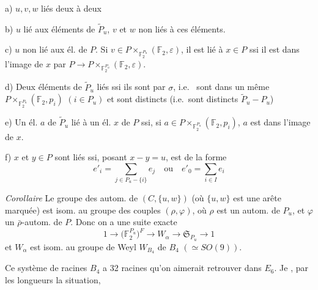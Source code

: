 \documentclass[11pt,a4paper]{article}
\begin{document}
a) $u, v, w$ liés deux à deux

b) $u$ lié aux éléments de $\widetilde{P}_u$, $v$ et $w$ non liés à ces
éléments.

c) $u$ non lié aux él. de \struck{\ill{}} $P$. Si
$v \in P \times_{\mathbb{F}_2^{P_u}} (\mathbb{F}_2, \varepsilon)$, il est
lié à $x \in P$ ssi il est dans l'image de $x$ par
$P \to P \times_{\mathbb{F}_2^{P_u}} (\mathbb{F}_2, \varepsilon)$.

d) Deux éléments de $\widetilde{P}_u$ liés ssi ils sont \ill{} par
$\sigma$, i.e.\ \struck{\ill{} \ill{}} sont \ill{} dans un même
$P \times_{\mathbb{F}_2^{P_u}} (\mathbb{F}_2, p_i)$ $(i \in P_u)$ et sont
distincts (i.e.\ sont distincts \ill{} $\widetilde{P}_u - P_u$)

e)  Un él. $a$ de $\widetilde{P}_u$ lié à un él. $x$ de $P$
ssi, si $a \in P \times_{\mathbb{F}_2^{P_u}} (\mathbb{F}_2, p_i)$, $a$ est
dans l'image de $x$.

f) $x$ et $y \in P$ sont liés ssi, posant $x - y = u$, \ill{}
est de la forme
\[
e'_i = \sum_{j \in P_u - \lbrace i \rbrace} e_j
\quad \text{ou} \quad
e'_0 = \sum_{i \in I} e_i
\]

\emph{Corollaire} 
Le groupe des autom. de $(C, \lbrace u, w \rbrace)$
 (où $\lbrace u, w \rbrace$ est une
arête marquée) est isom. au groupe des couples $(\rho, \varphi)$, où
$\rho$  est un autom.  de
$P_u$, et $\varphi$ un $\bar{\rho}$-autom.  de
$P$. Donc on a une suite exacte 
\[
1 \longrightarrow \bigl(\mathbb{F}_2^{P_u}\bigr)^{F} \longrightarrow W_{\alpha}
\longrightarrow \mathfrak{S}_{P_u} \longrightarrow 1
\]
et $W_{\alpha}$ est isom. au groupe de Weyl $W_{B_4}$ de $B_4$
$(\simeq SO(9))$.

Ce système de racines $B_4$ a 32 racines  qu'on aimerait retrouver  dans $E_6$.
Je \ill{} \ill{}, par \ill{} les longueurs \ill{} \ill{} la
situation,

\end{document}
